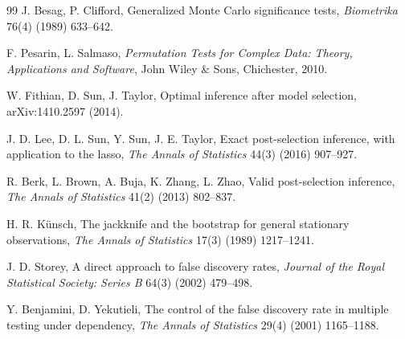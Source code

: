 \documentclass[preprint,12pt]{elsarticle}
\theoremstyle{definition}
\begin{document}
\begin{thebibliography}{99}
J. Besag, P. Clifford, Generalized Monte Carlo significance tests,
\emph{Biometrika} 76(4) (1989) 633--642.

F. Pesarin, L. Salmaso, \emph{Permutation Tests for Complex Data: Theory, Applications and Software}, John Wiley \& Sons, Chichester, 2010.

W. Fithian, D. Sun, J. Taylor, Optimal inference after model selection,
arXiv:1410.2597 (2014).

J. D. Lee, D. L. Sun, Y. Sun, J. E. Taylor, Exact post-selection inference, with application to the lasso,
\emph{The Annals of Statistics} 44(3) (2016) 907--927.

R. Berk, L. Brown, A. Buja, K. Zhang, L. Zhao, Valid post-selection inference,
\emph{The Annals of Statistics} 41(2) (2013) 802--837.

H. R. K\"unsch, The jackknife and the bootstrap for general stationary observations,
\emph{The Annals of Statistics} 17(3) (1989) 1217--1241.

J. D. Storey, A direct approach to false discovery rates,
\emph{Journal of the Royal Statistical Society: Series B} 64(3) (2002) 479--498.

Y. Benjamini, D. Yekutieli, The control of the false discovery rate in multiple testing under dependency,
\emph{The Annals of Statistics} 29(4) (2001) 1165--1188.

\end{thebibliography}
\end{document}
